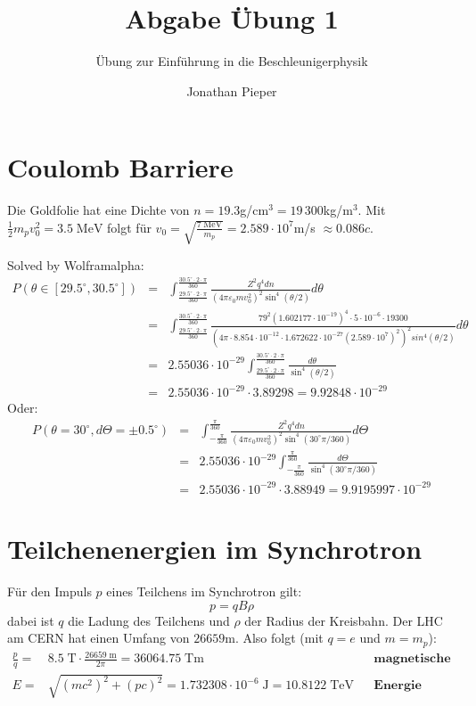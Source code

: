 \documentclass[12pt,DIV=15,a4paper,twoside,draft=false]{scrartcl}
\author{Jonathan Pieper}
\title{Abgabe Übung 1}
\subtitle{Übung zur Einführung in die Beschleunigerphysik}
\begin{document}
\maketitle
{}

\section{Coulomb Barriere}
Die Goldfolie hat eine Dichte von $n=19.3$\;g/cm$^{3} = 19\,{}300$\;kg/m$^3$. Mit $\frac{1}{2} m_p v_0^2 = 3.5\;\mathrm{MeV}$ folgt für $v_0 = \sqrt{\frac{7\;\mathrm{MeV}}{m_p}} = 2.589\cdot 10^7$\;m/s ${}\approx 0.086 c$.

Solved by Wolframalpha:
\begin{eqnarray*}
P(θ∈[29.5^\circ , 30.5^{\circ}]) &=&
 ∫_{\frac{29.5^\circ \cdot 2 \cdot \pi}{360}}^{\frac{30.5^{\circ} \cdot 2 \cdot \pi}{360}}
\frac{Z^2 q^4 d n}{(4 \pi ε_0 m v_0^2)^2 \sin^4(θ/2)} dθ\\
&=& ∫_{\frac{29.5^\circ \cdot 2 \cdot \pi}{360}}^{\frac{30.5^{\circ} \cdot 2 \cdot \pi}{360}}
 \frac{79^2 (1.602177\cdot 10^{-19})^4 \cdot 5\cdot 10^{-6} \cdot  19300}{(4 \pi \cdot 8.854 \cdot 10^{-12}\cdot  1.672622\cdot 10^{-27} (2.589\cdot 10^7)^2)^2 sin^4(θ/2)} dθ\\ %
&=& 2.55036\cdot 10^{-29} ∫_{\frac{29.5^\circ \cdot 2 \cdot \pi}{360}}^{\frac{30.5^{\circ} \cdot 2 \cdot \pi}{360}}
\frac{dθ}{\sin^4(θ/2)}\\
& = & 2.55036 \cdot 10^{-29} \cdot 3.89298 = 9.92848 \cdot 10^{-29}
\end{eqnarray*}
Oder:
\begin{eqnarray*}
P(θ=30^{\circ}, dΘ=±0.5^{\circ}) &=&
 ∫_{-\frac{\pi}{360}}^{\frac{\pi}{360}}
\frac{Z^2 q^4 d n}{(4 \pi ε_0 m v_0^2)^2 \sin^4(30^\circ \pi /360)} dΘ\\
&=& 2.55036\cdot 10^{-29} ∫_{-\frac{\pi}{360}}^{\frac{\pi}{360}}
\frac{dΘ}{\sin^4(30^\circ \pi /360)}\\
& = & 2.55036 \cdot 10^{-29}\cdot 3.88949 = 9.9195997 \cdot 10^{-29}
\end{eqnarray*}


\section{Teilchenenergien im Synchrotron}
Für den Impuls $p$ eines Teilchens im Synchrotron gilt:
$$ p = q B ρ $$
dabei ist $q$ die Ladung des Teilchens und $ρ$ der Radius der Kreisbahn. Der LHC am CERN hat einen Umfang von ${26659}$\;m. Also folgt (mit $q=e$ und $m=m_p$):
\begin{align*}
\frac{p}{q} =& 8.5\;\mathrm{T} \cdot \frac{26659\;\mathrm{m}}{2π} = 36064.75\;\mathrm{Tm} &&\textbf{magnetische Steifigkeit}\\
E =& \sqrt{(m c^2)^2 + (pc)^2} = 1.732308 \cdot 10^{-6}\;\mathrm{J} = 
10.8122\;\mathrm{TeV} && \textbf{Energie}
\end{align*}
\end{document}
